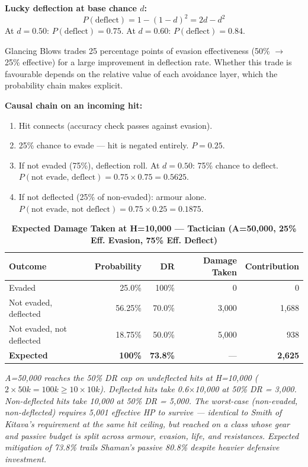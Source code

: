 \documentclass[12pt, letterpaper]{article}
\begin{document}
\textbf{Lucky deflection at base chance $d$:}
\[
P(\text{deflect}) = 1 - (1-d)^2 = 2d - d^2
\]
At $d = 0.50$: $P(\text{deflect}) = 0.75$. At $d = 0.60$: $P(\text{deflect}) = 0.84$.

Glancing Blows trades 25 percentage points of evasion effectiveness (50\% $\to$ 25\% effective) for a large improvement in deflection rate. Whether this trade is favourable depends on the relative value of each avoidance layer, which the probability chain makes explicit.

\textbf{Causal chain on an incoming hit:}
\begin{enumerate}
    \item Hit connects (accuracy check passes against evasion).
    \item 25\% chance to evade --- hit is negated entirely. $P = 0.25$.
    \item If not evaded (75\%), deflection roll. At $d = 0.50$: 75\% chance to deflect. $P(\text{not evade, deflect}) = 0.75 \times 0.75 = 0.5625$.
    \item If not deflected (25\% of non-evaded): armour alone. $P(\text{not evade, not deflect}) = 0.75 \times 0.25 = 0.1875$.
\end{enumerate}

\begin{table}[htbp]
\centering
\caption{\textbf{Expected Damage Taken at H=10{,}000 --- Tactician (A=50{,}000, 25\% Eff. Evasion, 75\% Eff. Deflect)}}
\begin{tabular}{lrrrr}
\toprule
\textbf{Outcome} & \textbf{Probability} & \textbf{DR} & \textbf{Damage Taken} & \textbf{Contribution} \\
\midrule
\rowcolor{rowalt} Evaded & 25.0\% & 100\% & 0 & 0 \\
Not evaded, deflected & 56.25\% & 70.0\% & 3{,}000 & 1{,}688 \\
\rowcolor{rowalt} Not evaded, not deflected & 18.75\% & 50.0\% & 5{,}000 & 938 \\
\midrule
\rowcolor{rowhi} \textbf{Expected} & \textbf{100\%} & \textbf{73.8\%} & --- & \textbf{2{,}625} \\
\bottomrule
\end{tabular}
\smallskip
\begin{minipage}{\linewidth}
\small\textit{A=50{,}000 reaches the 50\% DR cap on undeflected hits at H=10{,}000 ($2 \times 50k = 100k \geq 10 \times 10k$). Deflected hits take 0.6$\times$10{,}000 at 50\% DR = 3{,}000. Non-deflected hits take 10{,}000 at 50\% DR = 5{,}000. The worst-case (non-evaded, non-deflected) requires 5{,}001 effective HP to survive --- identical to Smith of Kitava's requirement at the same hit ceiling, but reached on a class whose gear and passive budget is split across armour, evasion, life, and resistances. Expected mitigation of 73.8\% trails Shaman's passive 80.8\% despite heavier defensive investment.}
\end{minipage}
\end{table}
\end{document}
